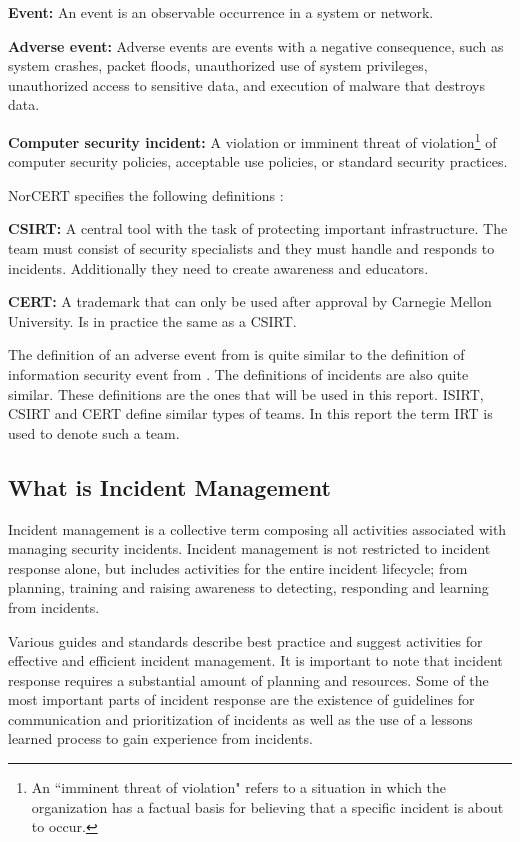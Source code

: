 \textbf{Event:} An event is an observable occurrence in a system or network.

\textbf{Adverse event:} Adverse events are events with a negative consequence, such as system crashes, packet floods, unauthorized use of system privileges, unauthorized access to sensitive data, and execution of malware that destroys data.

\textbf{Computer security incident:} A violation or imminent threat of violation\footnote{An ``imminent threat of violation" refers to a situation in which the organization has a factual basis for believing that a specific incident is about to occur.} of computer security policies, acceptable use policies, or standard security practices.

\acs{NorCERT} specifies the following definitions \cite{NorCERT3Kvartal2012}:

\textbf{\ac{CSIRT}:} A central tool with the task of protecting important infrastructure. The team must consist of security specialists and they must handle and responds to incidents. Additionally they need to create awareness and educators.

\textbf{\ac{CERT}:} A trademark that can only be used after approval by Carnegie Mellon University. Is in practice the same as a \acs{CSIRT}.

The definition of an adverse event from \cite{nist800-61} is quite similar to the definition of information security event from \cite{ISO/IEC27000}. The definitions of incidents are also quite similar. These definitions are the ones that will be used in this report. \ac{ISIRT}, \ac{CSIRT} and \ac{CERT} define similar types of teams. In this report the term \acs{IRT} is used to denote such a team. 

\subsection{What is Incident Management}
Incident management is a collective term composing all activities associated with managing security incidents. Incident management is not restricted to incident response alone, but includes activities for the entire incident lifecycle; from planning, training and raising awareness to detecting, responding and learning from incidents. 

Various guides and standards describe best practice and suggest activities for effective and efficient incident management. It is important to note that incident response requires a substantial amount of planning and resources. Some of the most important parts of incident response are the existence of guidelines for communication and prioritization of incidents as well as the use of a lessons learned process to gain experience from incidents. \cite{nist800-61}

